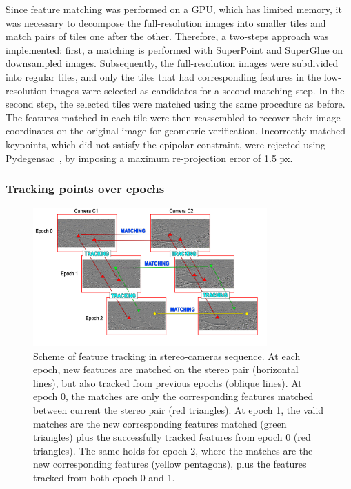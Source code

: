 Since feature matching was performed on a GPU, which has limited memory, it was necessary
to decompose the full-resolution images into smaller tiles and match pairs of tiles one
after the other.
Therefore, a two-steps approach was implemented: first, a matching is performed with
SuperPoint and SuperGlue on downsampled images. Subsequently, the
full-resolution images were subdivided into regular tiles, and only the tiles that had
corresponding features in the low-resolution images were selected as candidates for a
second matching step.
In the second step, the selected tiles were matched using the same procedure as before.
The features matched in each tile were then reassembled to recover their image
coordinates on the original image for geometric verification.
Incorrectly matched keypoints, which did not satisfy the epipolar constraint, were
rejected using Pydegensac~\citep{Mishkin2015_pydegensac}, by imposing a maximum
re-projection error of 1.5 px.

\subsubsection{Tracking points over epochs}\label{sec:4:tracking}

\begin{figure}
  \centering
  \includegraphics[width=0.8\textwidth]{3_tracking.png}
  \caption{Scheme of feature tracking in stereo-cameras sequence. At each epoch, new
    features are matched on the stereo pair (horizontal lines), but also tracked from
    previous epochs (oblique lines).
    At epoch 0, the matches are only the corresponding features matched
    between	current the stereo pair (red triangles).
    At epoch 1, the valid matches are the new corresponding features matched (green
    triangles) plus the successfully tracked features from epoch 0 (red triangles).
    The same holds for epoch 2, where the matches are the new
    corresponding features (yellow pentagons), plus the features tracked from both epoch
    0 and 1.}
  \label{fig:4:tracking}
\end{figure}

